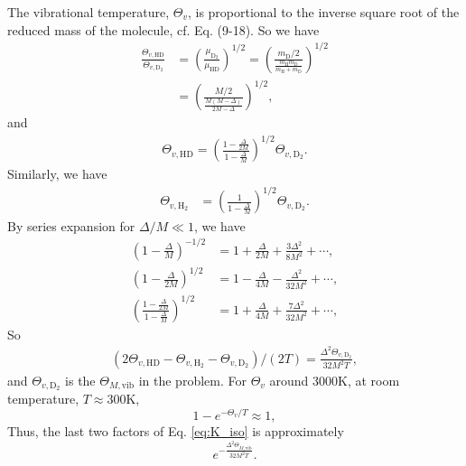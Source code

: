 \documentclass[twocolumn, 10pt]{article}
\numberwithin{equation}{section}
\newenvironment{solution}[1][\empty]
{\par\medskip\sffamily
  \textbf{\ifx\empty#1{Solution.}\relax\else{#1}\fi} \ignorespaces}
{\medskip}
\begin{document}
\begin{solution}
  The vibrational temperature, $\Theta_v$,
  is proportional to the inverse square root
  of the reduced mass of the molecule, cf. Eq. (9-18).
  So we have
  \begin{align*}
    \frac{ \Theta_{v, \mathrm{HD}  } }
         { \Theta_{v, \mathrm{D}_2 } }
    &=
    \left(
    \frac{ \mu_{\mathrm{D}_2} }
    { \mu_\mathrm{HD} }
    \right)^{1/2}
    =
    \left(
    \frac{
      m_\mathrm{D} /  2
    }
    {
      \frac{ m_\mathrm{H} m_\mathrm{D} }
           { m_\mathrm{H} + m_\mathrm{D} }
    }
    \right)^{1/2}
    \\
    &=
    \left(
    \frac{ M/2 }
    { \frac{M(M-\Delta)}{2M-\Delta} }
    \right)^{1/2}
    ,
  \end{align*}
  and
  \begin{align*}
    \Theta_{v, \mathrm{HD}}
    =
    \left(
    \frac{ 1 - \frac{\Delta}{2M} }
         { 1 - \frac{\Delta}{M} }
    \right)^{1/2}
    \Theta_{v, \mathrm{D}_2}
    .
  \end{align*}
  Similarly, we have
  \begin{align*}
    \Theta_{v, \mathrm{H}_2}
    &=
    \left(
    \frac{ 1 }
         { 1-\frac{\Delta}{M} }
    \right)^{1/2}
    \Theta_{v, \mathrm{D}_2}
    .
  \end{align*}
  By series expansion for $\Delta/M \ll 1$,
  we have
  \begin{align*}
    \left( 1 - \frac{\Delta}{M} \right)^{-1/2}
    &=
    1 + \frac{\Delta}{2M} + \frac{3\Delta^2}{8M^2} + \cdots,
    \\
    \left( 1 - \frac{\Delta}{2M} \right)^{1/2}
    &=
    1 - \frac{\Delta}{4M} - \frac{\Delta^2}{32M^2} + \cdots,
    \\
    \left(
    \frac{ 1 - \frac{\Delta}{2M} }
         { 1 - \frac{\Delta}{M} }
    \right)^{1/2}
    &=
    1 + \frac{\Delta}{4M} + \frac{7\Delta^2}{32M^2} + \cdots,
  \end{align*}
  So
  \begin{align*}
    \left(
    2\Theta_{v, \mathrm{HD}}
    -\Theta_{v, \mathrm{H}_2}
    -\Theta_{v, \mathrm{D}_2}
    \right)/(2T)
    =
    \frac{\Delta^2
    \Theta_{v, \mathrm{D}_2 }
    }{32M^2 T}
    ,
  \end{align*}
  and $\Theta_{v, \mathrm{D}_2}$
  is the $\Theta_{M, \mathrm{vib}}$
  in the problem.
  For $\Theta_v$ around $3000$K,
  at room temperature, $T \approx 300$K,
  $$
  1 - e^{-\Theta_v/T} \approx 1,
  $$
  Thus, the last two factors of Eq. \eqref{eq:K_iso}
  is approximately
  $$
    e^{-\frac{\Delta^2
    \Theta_{M, \mathrm{vib} }
    }{32M^2 T}}
    .
  $$


\end{solution}
\end{document}
